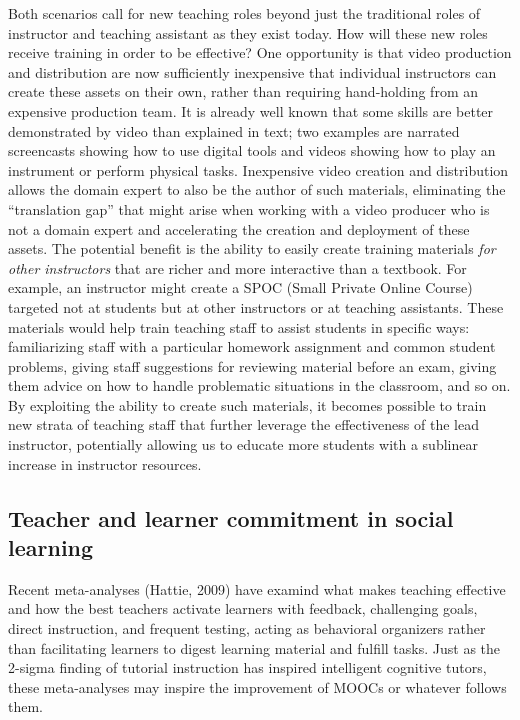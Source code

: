 Both scenarios call for new teaching roles beyond just the traditional
roles of instructor and teaching assistant as they exist today.
How will these new roles receive training in order to be effective?
One opportunity is that video production and distribution are now
sufficiently inexpensive that individual instructors can create these
assets on their own, rather than requiring hand-holding from an
expensive production team.
It is already well known that some skills are better demonstrated by
video than explained in text; two examples are narrated screencasts
showing how to use digital tools and videos showing how to play an
instrument or perform physical tasks.
Inexpensive video creation and distribution allows the domain expert to
also be the author of such materials, eliminating the ``translation
gap'' that might arise when working with a video producer who is not a
domain expert and accelerating the creation and deployment of these
assets.
The potential benefit is the ability to easily create training materials
\emph{for other instructors} that are richer and more interactive than a
textbook. For example, an instructor might create a SPOC (Small Private
Online Course) targeted not at students but at other instructors or at
teaching assistants.
These materials would help train teaching staff to assist students in
specific ways: familiarizing staff with a particular homework
assignment and common student problems, giving staff suggestions for
reviewing material before an exam, giving them advice on how to handle
problematic situations in the classroom, and so on.
By exploiting the ability to create such materials, it becomes
possible to train new strata of teaching staff that further leverage
the effectiveness of the lead instructor, potentially allowing us to
educate more students with a sublinear increase in instructor
resources.


\subsection{Teacher and learner commitment in social learning}

Recent meta-analyses (Hattie, 2009) have examind what makes teaching
effective and how the best teachers activate learners with feedback,
challenging goals, direct instruction, and frequent testing, acting as
behavioral organizers rather than facilitating learners to digest
learning material and fulfill tasks.
Just as the 2-sigma finding of tutorial instruction has inspired
intelligent cognitive tutors, these meta-analyses may inspire the
improvement of MOOCs or
whatever follows them.

